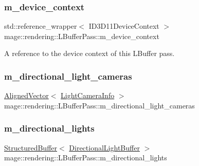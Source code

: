 \subsubsection{\texorpdfstring{m\+\_\+device\+\_\+context}{m\_device\_context}}
{\footnotesize\ttfamily std\+::reference\+\_\+wrapper$<$ I\+D3\+D11\+Device\+Context $>$ mage\+::rendering\+::\+L\+Buffer\+Pass\+::m\+\_\+device\+\_\+context\hspace{0.3cm}{\ttfamily [private]}}

A reference to the device context of this L\+Buffer pass. \mbox{\label{classmage_1_1rendering_1_1_l_buffer_pass_a89e1e0ae0ff65c26e18cd7e11e13523f}} 
\subsubsection{\texorpdfstring{m\+\_\+directional\+\_\+light\+\_\+cameras}{m\_directional\_light\_cameras}}
{\footnotesize\ttfamily \mbox{\hyperlink{namespacemage_a8664bfb5ce2179fc64eae9f82c8a5ba8}{Aligned\+Vector}}$<$ \mbox{\hyperlink{structmage_1_1rendering_1_1_l_buffer_pass_1_1_light_camera_info}{Light\+Camera\+Info}} $>$ mage\+::rendering\+::\+L\+Buffer\+Pass\+::m\+\_\+directional\+\_\+light\+\_\+cameras\hspace{0.3cm}{\ttfamily [private]}}

\mbox{\label{classmage_1_1rendering_1_1_l_buffer_pass_a46bc97b1576c1f1702d26c827785c343}} 
\subsubsection{\texorpdfstring{m\+\_\+directional\+\_\+lights}{m\_directional\_lights}}
{\footnotesize\ttfamily \mbox{\hyperlink{classmage_1_1rendering_1_1_structured_buffer}{Structured\+Buffer}}$<$ \mbox{\hyperlink{structmage_1_1rendering_1_1_directional_light_buffer}{Directional\+Light\+Buffer}} $>$ mage\+::rendering\+::\+L\+Buffer\+Pass\+::m\+\_\+directional\+\_\+lights\hspace{0.3cm}{\ttfamily [private]}}

